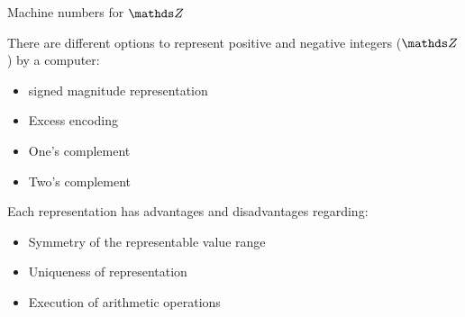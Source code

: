 










\begin{vbframe}{Machine numbers for $\Z$}


%
There are different options to represent positive and negative integers ($\Z$) by a computer:
\begin{itemize}
  \item signed magnitude representation
  \item Excess encoding
  \item One's complement
  \item Two's complement
\end{itemize}

\lz 


Each representation has advantages and disadvantages regarding:
\begin{itemize}
  \item Symmetry of the representable value range
  \item Uniqueness of representation
  \item Execution of arithmetic operations
\end{itemize}
\end{vbframe}


